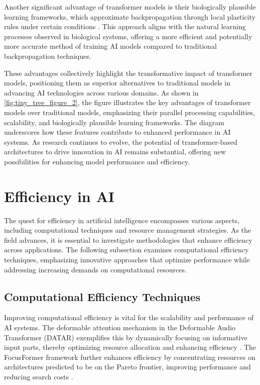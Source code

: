 Another significant advantage of transformer models is their biologically plausible learning frameworks, which approximate backpropagation through local plasticity rules under certain conditions \cite{yang2021bioleafbioplausiblelearningframework}. This approach aligns with the natural learning processes observed in biological systems, offering a more efficient and potentially more accurate method of training AI models compared to traditional backpropagation techniques.

These advantages collectively highlight the transformative impact of transformer models, positioning them as superior alternatives to traditional models in advancing AI technologies across various domains. As shown in \autoref{fig:tiny_tree_figure_2}, the figure illustrates the key advantages of transformer models over traditional models, emphasizing their parallel processing capabilities, scalability, and biologically plausible learning frameworks. The diagram underscores how these features contribute to enhanced performance in AI systems. As research continues to evolve, the potential of transformer-based architectures to drive innovation in AI remains substantial, offering new possibilities for enhancing model performance and efficiency.






\section{Efficiency in AI} \label{sec:Efficiency in AI}

The quest for efficiency in artificial intelligence encompasses various aspects, including computational techniques and resource management strategies. As the field advances, it is essential to investigate methodologies that enhance efficiency across applications. The following subsection examines computational efficiency techniques, emphasizing innovative approaches that optimize performance while addressing increasing demands on computational resources.


\subsection{Computational Efficiency Techniques} \label{subsec:Computational Efficiency Techniques}

Improving computational efficiency is vital for the scalability and performance of AI systems. The deformable attention mechanism in the Deformable Audio Transformer (DATAR) exemplifies this by dynamically focusing on informative input parts, thereby optimizing resource allocation and enhancing efficiency \cite{zhu2024deformableaudiotransformeraudio}. The FocusFormer framework further enhances efficiency by concentrating resources on architectures predicted to be on the Pareto frontier, improving performance and reducing search costs \cite{liu2022focusformerfocusingneedarchitecture}.

